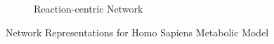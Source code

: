 \begin{figure}[!ht]
\begin{subfigure}{0.5\textwidth}
		\caption{Reaction-centric Network}
		\label{figure-reaction-centric}
	\end{subfigure}
	\caption{Network Representations for Homo Sapiens Metabolic Model}
	\label{figure-metabolic-networks}
\end{figure}